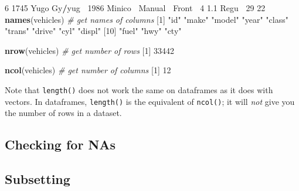 \documentclass[
]{book}
\newenvironment{Shaded}{\begin{snugshade}}{\end{snugshade}}
\newcommand{\CommentTok}[1]{\textcolor[rgb]{0.56,0.35,0.01}{\textit{#1}}}
\newcommand{\DecValTok}[1]{\textcolor[rgb]{0.00,0.00,0.81}{#1}}
\newcommand{\FloatTok}[1]{\textcolor[rgb]{0.00,0.00,0.81}{#1}}
\newcommand{\KeywordTok}[1]{\textcolor[rgb]{0.13,0.29,0.53}{\textbf{#1}}}
\newcommand{\NormalTok}[1]{#1}
\newcommand{\OperatorTok}[1]{\textcolor[rgb]{0.81,0.36,0.00}{\textbf{#1}}}
\newcommand{\StringTok}[1]{\textcolor[rgb]{0.31,0.60,0.02}{#1}}
\begin{document}
\begin{Shaded}
\begin{Highlighting}[]
\DecValTok{6}  \DecValTok{1745}\NormalTok{ Yugo  Gy}\OperatorTok{/}\NormalTok{yug}\OperatorTok{~}\StringTok{  }\DecValTok{1986}\NormalTok{ Minico}\OperatorTok{~}\StringTok{ }\NormalTok{Manual}\OperatorTok{~}\StringTok{ }\NormalTok{Front}\OperatorTok{~}\StringTok{     }\DecValTok{4}   \FloatTok{1.1}\NormalTok{ Regu}\OperatorTok{~}\StringTok{    }\DecValTok{29}    \DecValTok{22}
\KeywordTok{names}\NormalTok{(vehicles) }\CommentTok{# get names of columns}
\NormalTok{ [}\DecValTok{1}\NormalTok{] }\StringTok{"id"}    \StringTok{"make"}  \StringTok{"model"} \StringTok{"year"}  \StringTok{"class"} \StringTok{"trans"} \StringTok{"drive"} \StringTok{"cyl"}   \StringTok{"displ"}
\NormalTok{[}\DecValTok{10}\NormalTok{] }\StringTok{"fuel"}  \StringTok{"hwy"}   \StringTok{"cty"}  

\KeywordTok{nrow}\NormalTok{(vehicles) }\CommentTok{# get number of rows}
\NormalTok{[}\DecValTok{1}\NormalTok{] }\DecValTok{33442}

\KeywordTok{ncol}\NormalTok{(vehicles) }\CommentTok{# get number of columns}
\NormalTok{[}\DecValTok{1}\NormalTok{] }\DecValTok{12}
\end{Highlighting}
\end{Shaded}

Note that \texttt{length()} does not work the same on dataframes as it does with vectors. In dataframes, \texttt{length()} is the equivalent of \texttt{ncol()}; it will \emph{not} give you the number of rows in a dataset.

\hypertarget{checking-for-nas}{%
\subsection*{Checking for NAs}\label{checking-for-nas}}

\begin{Shaded}
\end{Shaded}

\hypertarget{subsetting-1}{%
\subsection*{Subsetting}\label{subsetting-1}}
\end{document}
